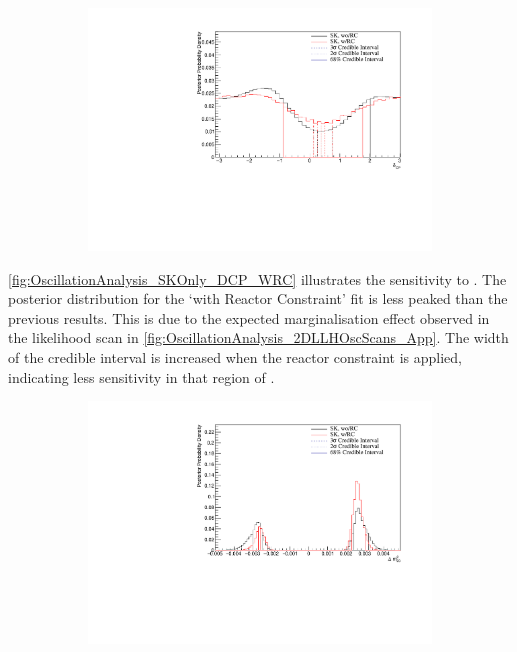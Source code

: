 \begin{figure}[h]
  \begin{subfigure}[t]{1.0\textwidth}
    \includegraphics[width=\textwidth, trim={0mm 0mm 0mm 0mm}, clip,page=1]{Figures/OA/SKOnlyFit_wRC/ContourComparison_1D_dcp_BH_1_wRC_woRC_UnSmeared_CredibleInterval.pdf}
  \end{subfigure}
  \caption{}
  \label{fig:OscillationAnalysis_SKOnly_DCP_WRC}
\end{figure}

\autoref{fig:OscillationAnalysis_SKOnly_DCP_WRC} illustrates the sensitivity to \dcp. The posterior distribution for the `with Reactor Constraint' fit is less peaked than the previous results. This is due to the expected marginalisation effect observed in the likelihood scan in \autoref{fig:OscillationAnalysis_2DLLHOscScans_App}. The width of the \quickmath{1\sigma} credible interval is increased when the reactor constraint is applied, indicating less sensitivity in that region of . 

\begin{figure}[h]
  \begin{subfigure}[t]{1.0\textwidth}
    \includegraphics[width=\textwidth, trim={0mm 0mm 0mm 0mm}, clip,page=1]{Figures/OA/SKOnlyFit_wRC/ContourComparison_1D_dm32_BH_1_wRC_woRC_UnSmeared_CredibleInterval.pdf}
  \end{subfigure}
  \caption{}
  \label{fig:OscillationAnalysis_SKOnly_DELM32_WRC}
\end{figure}

